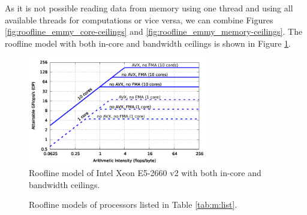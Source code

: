 As it is not possible reading data from memory using one thread and using all available threads for computations or vice versa, we can combine Figures \ref{fig:roofline_emmy_core-ceilings} and \ref{fig:roofline_emmy_memory-ceilings}. The roofline model with both in-core and bandwidth ceilings is shown in Figure \ref{fig:roofline_emmy_all-ceilings}.

\begin{figure}[t]
   \centering
   \includegraphics[width=0.7\textwidth,clip=true]{images/roofline/roofline_emmy_Xeon2660v2_all-ceilings.pdf}
   \caption{Roofline model of Intel Xeon E5-2660 v2 with both in-core and bandwidth ceilings.}
  \label{fig:roofline_emmy_all-ceilings}
\end{figure}

\begin{figure}%
  \centering%
  \caption{Roofline models of processors listed in Table \ref{tab:m:list}.}%
  \label{fig:rooflines}
\end{figure}

